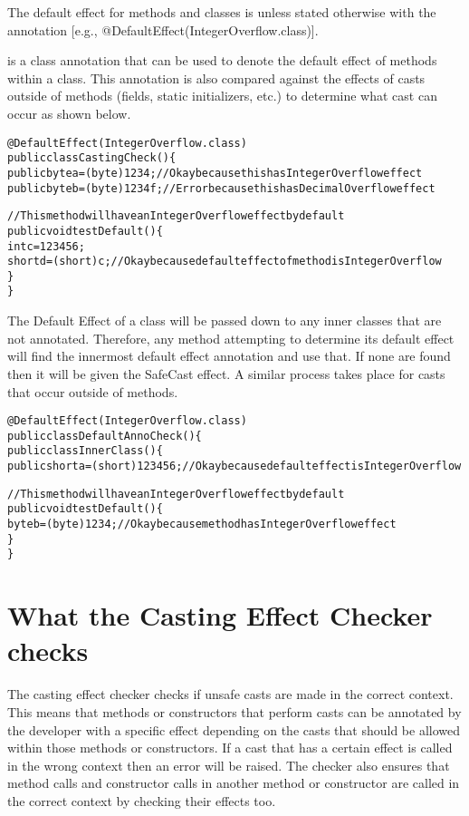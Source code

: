 The default effect for methods and classes is  unless stated otherwise with the  annotation [e.g., @DefaultEffect(IntegerOverflow.class)].

 is a class annotation that can be used to denote the default effect of methods within a class. This annotation is also compared against the effects of casts outside of methods (fields, static initializers, etc.) to determine what cast can occur as shown below.

\begin{alltt}
@DefaultEffect(IntegerOverflow.class)
public class CastingCheck() \{
    public byte a = (byte) 1234; //Okay because this has IntegerOverflow effect
    public byte b = (byte) 1234f; //Error because this has DecimalOverflow effect

    //This method will have an IntegerOverflow effect by default
    public void testDefault() \{
        int c = 123456;
        short d = (short) c; //Okay because default effect of method is IntegerOverflow
    \}
\}
\end{alltt}

The Default Effect of a class will be passed down to any inner classes that are not annotated. Therefore, any method attempting to determine its default effect will find the innermost default effect annotation and use that. If none are found then it will be given the SafeCast effect. A similar process takes place for casts that occur outside of methods.
\begin{alltt}
@DefaultEffect(IntegerOverflow.class)
public class DefaultAnnoCheck() \{
    public class InnerClass() \{
        public short a = (short) 123456; //Okay because default effect is IntegerOverflow

        //This method will have an IntegerOverflow effect by default
        public void testDefault() \{
            byte b = (byte) 1234; //Okay because method has IntegerOverflow effect
        \}
\}
\end{alltt}

\section{What the Casting Effect Checker checks\label{castingeffect-checks}}

The casting effect checker checks if unsafe casts are made in the correct context. This means that methods or constructors that perform casts can be annotated by the developer with a specific effect depending on the casts that should be allowed within those methods or constructors. If a cast that has a certain effect is called in the wrong context then an error will be raised. The checker also ensures that method calls and constructor calls in another method or constructor are called in the correct context by checking their effects too.

